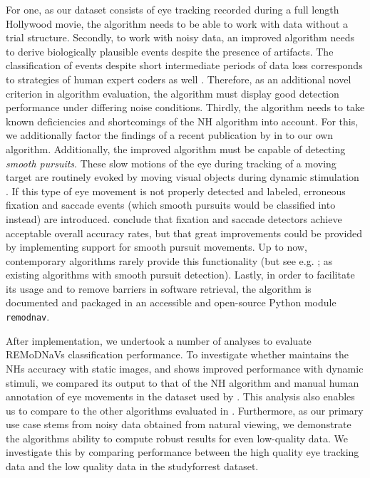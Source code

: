 For one, as our dataset consists of eye tracking recorded during a full length Hollywood movie, the algorithm
needs to be able to work with data without a trial structure.  Secondly, to work with noisy data, an improved
algorithm needs to derive biologically plausible events despite the presence of artifacts. The classification of
events despite short intermediate periods of data loss corresponds to strategies of human expert coders as
well \citep{Hooge2018}. Therefore, as an additional novel criterion in algorithm evaluation, the algorithm must
display good detection performance under differing noise conditions. Thirdly, the algorithm needs to take known
deficiencies and shortcomings of the NH algorithm into account. For this, we additionally factor the findings of
a recent publication by \cite{Friedman2018} in to our own algorithm.
Additionally, the improved algorithm must be capable of detecting \textit{smooth pursuits}. These slow motions of
the eye during tracking of a moving target are routinely evoked by moving visual objects during dynamic stimulation
\citep{carl1987pursuits}. If this type of eye movement is not properly detected and labeled, erroneous fixation and
saccade events (which smooth pursuits would be classified into instead) are introduced. \cite{Andersson2017}
conclude that fixation and saccade detectors achieve acceptable overall accuracy rates, but that great improvements
could be provided by implementing support for smooth pursuit movements. Up to now, contemporary algorithms rarely
provide this functionality (but see e.g. \cite{LARSSON2015145}; \cite{Komogortsev2013} as existing algorithms with
smooth pursuit detection).  Lastly, in order to facilitate its usage and to remove barriers in software
retrieval, the \remodnav algorithm is documented and packaged in an accessible and open-source Python module
\texttt{remodnav}.


After implementation, we undertook a number of analyses to evaluate REMoDNaVs classification performance. To
investigate whether \remodnav maintains the NHs accuracy with static images, and shows improved performance with
dynamic stimuli, we compared its output to that of the NH algorithm and manual human annotation of eye movements
in the dataset used by \cite{Andersson2017}. This analysis also enables us to compare \remodnav to the other
algorithms evaluated in \citet{Andersson2017}. Furthermore, as our primary use case stems from noisy data obtained
from natural viewing, we demonstrate the algorithms ability to compute robust results for even low-quality data.
We investigate this by comparing performance between the high quality eye tracking data and the low quality data
in the studyforrest dataset.


